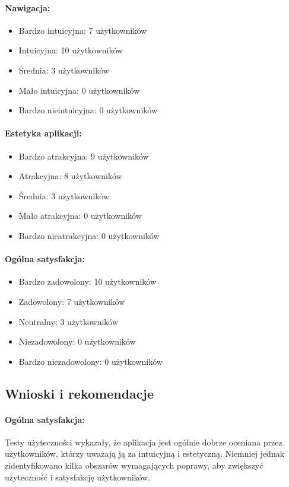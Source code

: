 \paragraph{Nawigacja:}
\begin{itemize}
  \item Bardzo intuicyjna: 7 użytkowników
  \item Intuicyjna: 10 użytkowników
  \item Średnia: 3 użytkowników
  \item Mało intuicyjna: 0 użytkowników
  \item Bardzo nieintuicyjna: 0 użytkowników
\end{itemize}

\paragraph{Estetyka aplikacji:}
\begin{itemize}
  \item Bardzo atrakcyjna: 9 użytkowników
  \item Atrakcyjna: 8 użytkowników
  \item Średnia: 3 użytkowników
  \item Mało atrakcyjna: 0 użytkowników
  \item Bardzo nieatrakcyjna: 0 użytkowników
\end{itemize}

\paragraph{Ogólna satysfakcja:}
\begin{itemize}
  \item Bardzo zadowolony: 10 użytkowników
  \item Zadowolony: 7 użytkowników
  \item Neutralny: 3 użytkowników
  \item Niezadowolony: 0 użytkowników
  \item Bardzo niezadowolony: 0 użytkowników
\end{itemize}

\begin{center}
  \subsection{Wnioski i rekomendacje}
\end{center}

\paragraph{Ogólna satysfakcja:} Testy użyteczności wykazały, że aplikacja jest ogólnie dobrze oceniana przez użytkowników, którzy uważają ją za intuicyjną i estetyczną. Niemniej jednak zidentyﬁkowano kilka obszarów wymagających poprawy, aby zwiększyć użyteczność i satysfakcję użytkowników.

